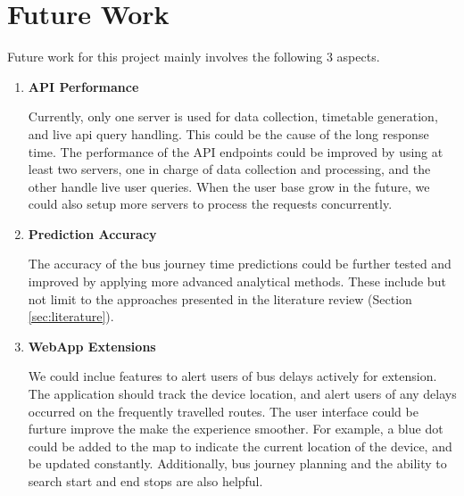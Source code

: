\chapter{Future Work}
\par Future work for this project mainly involves the following 3 aspects.
\label{ch:future_work}
\begin{enumerate}
  \item \textbf{API Performance}
\par Currently, only one server is used for data collection, timetable generation, and live \acrshort{api} query handling. This could be the cause of the long response time. The performance of the API endpoints could be improved by using at least two servers, one in charge of data collection and processing, and the other handle live user queries. When the user base grow in the future, we could also setup more servers to process the requests concurrently.

\item \textbf{Prediction Accuracy}
\par The accuracy of the bus journey time predictions could be further tested and improved by applying more advanced analytical methods. These include but not limit to the approaches presented in the literature review (Section \ref{sec:literature}).

\item \textbf{WebApp Extensions}
\par We could inclue features to alert users of bus delays actively for extension. The application should track the device location, and alert users of any delays occurred on the frequently travelled routes. The user interface could be furture improve the make the experience smoother. For example, a blue dot could be added to the map to indicate the current location of the device, and be updated constantly. Additionally, bus journey planning and the ability to search start and end stops are also helpful.
\end{enumerate}


